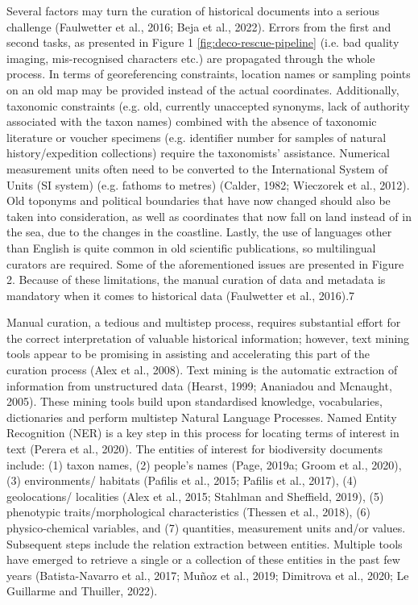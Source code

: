    Several factors may turn the curation of historical documents into a serious challenge (Faulwetter et al., 2016; Beja et al., 2022). Errors from the first and second tasks, as presented in Figure 1 \ref{fig:deco-rescue-pipeline} (i.e. bad quality imaging, mis-recognised characters etc.) are propagated through the whole process. In terms of georeferencing constraints, location names or sampling points on an old map may be provided instead of the actual coordinates. Additionally, taxonomic constraints (e.g. old, currently unaccepted synonyms, lack of authority associated with the taxon names) combined with the absence of taxonomic literature or voucher specimens (e.g. identifier number for samples of natural history/expedition collections) require the taxonomists’ assistance. Numerical measurement units often need to be converted to the International System of Units (SI system) (e.g. fathoms to metres) (Calder, 1982; Wieczorek et al., 2012). Old toponyms and political boundaries that have now changed should also be taken into consideration, as well as coordinates that now fall on land instead of in the sea, due to the changes in the coastline. Lastly, the use of languages other than English is quite common in old scientific publications, so multilingual curators are required. Some of the aforementioned issues are presented in Figure 2. Because of these limitations, the manual curation of data and metadata is mandatory when it comes to historical data (Faulwetter et al., 2016).7

Manual curation, a tedious and multistep process, requires substantial effort for the correct interpretation of valuable historical information; however, text mining tools appear to be promising in assisting and accelerating this part of the curation process (Alex et al., 2008). Text mining is the automatic extraction of information from unstructured data (Hearst, 1999; Ananiadou and Mcnaught, 2005). These mining tools build upon standardised knowledge, vocabularies, dictionaries and perform multistep Natural Language Processes. Named Entity Recognition (NER) is a key step in this process for locating terms of interest in text (Perera et al., 2020). The entities of interest for biodiversity documents include: (1) taxon names, (2) people’s names (Page, 2019a; Groom et al., 2020), (3) environments/ habitats (Pafilis et al., 2015; Pafilis et al., 2017), (4) geolocations/ localities (Alex et al., 2015; Stahlman and Sheffield, 2019), (5) phenotypic traits/morphological characteristics (Thessen et al., 2018), (6) physico-chemical variables, and (7) quantities, measurement units and/or values. Subsequent steps include the relation extraction between entities. Multiple tools have emerged to retrieve a single or a collection of these entities in the past few years (Batista-Navarro et al., 2017; Muñoz et al., 2019; Dimitrova et al., 2020; Le Guillarme and Thuiller, 2022).

